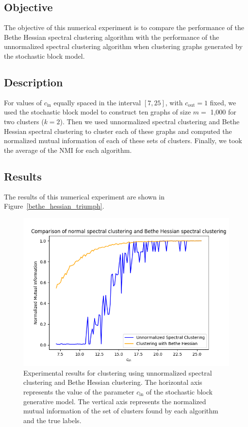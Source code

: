 \subsection*{Objective}
The objective of this numerical experiment is to compare the performance of the Bethe Hessian spectral clustering algorithm with the performance of the unnormalized spectral clustering algorithm when clustering graphs generated by the stochastic block model.
\subsection*{Description}
For values of $c_\text{in}$ equally spaced in the interval $[7,25]$, with $c_\text{out} = 1$ fixed, we used the stochastic block model to construct ten graphs of size $m =$ 1,000 for two clusters ($k = 2$).
Then we used unnormalized spectral clustering and Bethe Hessian spectral clustering to cluster each of these graphs and computed the normalized mutual information of each of these sets of clusters.
Finally, we took the average of the NMI for each algorithm.

\subsection*{Results}
The results of this numerical experiment are shown in Figure~\vref{bethe_hessian_triumph}.

\begin{figure}[h]
\begin{center}
\includegraphics[width=14cm]{figures/bethe_hessian_triumph.png}
\end{center}
   \caption[Experimental results for clustering using unnormalized spectral clustering and Bethe Hessian clustering]{Experimental results for clustering using unnormalized spectral clustering and Bethe Hessian clustering. The horizontal axis represents the value of the parameter $c_\text{in}$ of the stochastic block generative model. The vertical axis represents the normalized mutual information of the set of clusters found by each algorithm and the true labels.}
\label{bethe_hessian_triumph}
\end{figure}

